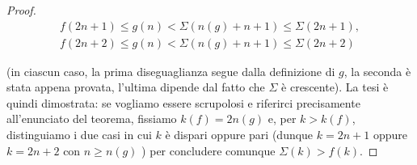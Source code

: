 \begin{proof}
    \[
        \begin{gathered}
            f(2 n+1) \leq g(n)<\Sigma(n(g)+n+1) \leq \Sigma(2 n+1), \\
            f(2 n+2) \leq g(n)<\Sigma(n(g)+n+1) \leq \Sigma(2 n+2)
        \end{gathered}
    \]

    (in ciascun caso, la prima diseguaglianza segue dalla definizione di $g$, la seconda
    è stata appena provata, l'ultima dipende dal fatto che $\Sigma$ è crescente). La tesi
    è quindi dimostrata: se vogliamo essere scrupolosi e riferirci precisamente
    all'enunciato del teorema, fissiamo $k(f)=2 n(g)$ e, per $k>k(f)$,
    distinguiamo i due casi in cui $k$ è dispari oppure pari (dunque $k=2 n+1$ oppure
    $k=2 n+2$ con $n \geq n(g)$ ) per concludere comunque $\Sigma(k)>f(k)$.
\end{proof}

